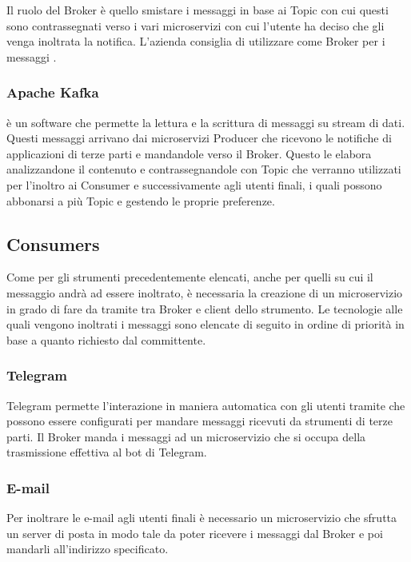 		Il ruolo del Broker è quello smistare i messaggi in base ai Topic con cui questi sono contrassegnati verso i vari microservizi con cui l'utente ha deciso che gli venga inoltrata la notifica.
		L'azienda consiglia di utilizzare come Broker per i messaggi .
	
		\subsubsection{Apache Kafka}
		 è un software  che permette la lettura e la scrittura di messaggi su stream di dati.
		Questi messaggi arrivano dai microservizi Producer che ricevono le notifiche di applicazioni di terze parti e mandandole verso il Broker. Questo le elabora analizzandone il contenuto e contrassegnandole con Topic che verranno utilizzati per l'inoltro ai Consumer e successivamente agli utenti finali, i quali possono abbonarsi a più Topic e gestendo le proprie preferenze.
		
	
	\subsection{Consumers}
		Come per gli strumenti precedentemente elencati, anche per quelli su cui il messaggio andrà ad essere inoltrato, è necessaria la creazione di un microservizio in grado di fare da tramite tra Broker e client dello strumento.
		Le tecnologie alle quali vengono inoltrati i messaggi sono elencate di seguito in ordine di priorità in base a quanto richiesto dal committente.
			
		\subsubsection{Telegram}
		Telegram permette l'interazione in maniera automatica con gli utenti tramite  che possono essere configurati per mandare messaggi ricevuti da strumenti di terze parti.
		Il Broker manda i messaggi ad un microservizio che si occupa della trasmissione effettiva al bot di Telegram.
		
		\subsubsection{E-mail}
		Per inoltrare le e-mail agli utenti finali è necessario un microservizio che sfrutta un server di posta in modo tale da poter ricevere i messaggi dal Broker e poi mandarli all'indirizzo specificato.
		
